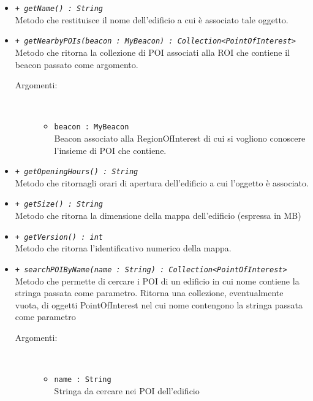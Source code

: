 \documentclass[../DefinizioneDiProdotto.tex]{subfiles}
\begin{document}
\begin{description}
\begin{itemize}
		\item \texttt{+ \textit{getName() : String}}\\
		Metodo che restituisce il nome dell'edificio a cui è associato tale oggetto.
		\item \texttt{+ \textit{getNearbyPOIs(beacon : MyBeacon) : Collection<PointOfInterest>}}\\
		Metodo che ritorna la collezione di POI associati alla ROI che contiene il beacon passato come argomento.
		\begin{description}
			\item[Argomenti:] \
			\begin{itemize}
				\item \texttt{beacon : MyBeacon}\\
				Beacon associato alla RegionOfInterest di cui si vogliono conoscere l'insieme di POI che contiene.\end{itemize}
		\end{description}
		\item \texttt{+ \textit{getOpeningHours() : String}}\\
		Metodo che ritornagli orari di apertura dell'edificio a cui l'oggetto è associato.
		\item \texttt{+ \textit{getSize() : String}}\\
		Metodo che ritorna la dimensione della mappa dell'edificio (espressa in MB)
		\item \texttt{+ \textit{getVersion() : int}}\\
		Metodo che ritorna l'identificativo numerico della mappa.
		\item \texttt{+ \textit{searchPOIByName(name : String) : Collection<PointOfInterest>}}\\
		Metodo che permette di cercare i POI di un edificio in cui nome contiene la stringa passata come parametro. Ritorna una collezione, eventualmente vuota,  di oggetti PointOfInterest nel cui nome contengono la stringa passata come parametro
		\begin{description}
			\item[Argomenti:] \
			\begin{itemize}
				\item \texttt{name : String}\\
				Stringa da cercare nei POI dell'edificio\end{itemize}
		\end{description}
	\end{itemize}
\end{description}
\end{document}
